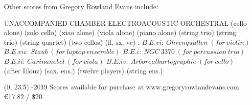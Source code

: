 \documentclass[10pt]{article}
\begin{document}

\begin{center}
\fontsize{.7cm}{1em}\selectfont Other scores from Gregory Rowland Evans include: \hfill
\end{center}
\vspace*{4\baselineskip}
{
\begin{center}
\setlength{\columnseprule}{1pt}
\setlength{\columnsep}{6em}

\begin{paracol}{4}
\fontsize{.4cm}{1em}\selectfont UNACCOMPANIED
\switchcolumn[1]
\fontsize{.4cm}{1em}\selectfont CHAMBER
\switchcolumn[2]
\fontsize{.4cm}{1em}\selectfont ELECTROACOUSTIC
\switchcolumn[3]
\fontsize{.4cm}{1em}\selectfont ORCHESTRAL
\switchcolumn[0]
\fontsize{.1cm}{0.5em}  (cello alone)
\switchcolumn[0]
\hfill
\switchcolumn[0]
\fontsize{.1cm}{0.5em}  (solo cello)
\switchcolumn[0]
\hfill
 \switchcolumn[0]
\fontsize{.1cm}{0.5em}  (xiao alone)
\switchcolumn[0]
\hfill
\switchcolumn[0]
\fontsize{.1cm}{0.5em}  (viola alone)
\switchcolumn[0]
\hfill
\switchcolumn[0]
\fontsize{.1cm}{0.5em}  (piano alone)
\switchcolumn[1]
\fontsize{.1cm}{0.5em} 
\switchcolumn[1]
\hfill
\switchcolumn[1]
\fontsize{.1cm}{0.5em}  (string trio)
\switchcolumn[1]
\hfill
\switchcolumn[1]
\fontsize{.1cm}{0.5em}  (string trio)
\switchcolumn[1]
\hfill
\switchcolumn[1]
\fontsize{.1cm}{0.5em}  (string quartet)
\switchcolumn[1]
\hfill
\switchcolumn[1]
\fontsize{.1cm}{0.5em}  (two cellos)
\switchcolumn[1]
\hfill
\switchcolumn[1]
\fontsize{.1cm}{0.5em}  (fl, sx, vc)
\switchcolumn[2]
\fontsize{.1cm}{0.5em} :
\switchcolumn[2]
\fontsize{.05cm}{0.5em}  $B.E.vi: \ Ohrenquallen \ (for \ violin)$
\switchcolumn[2]
\fontsize{.05cm}{0.5em}  $B.E.vii: \ Staub \ (for \ laptop \ ensemble)$
\switchcolumn[2]
\fontsize{.05cm}{0.5em}  $B.E.i: \ NGC \ 3370 \ (for \ percussion \ trio)$
\switchcolumn[2]
\fontsize{.05cm}{0.5em}  $B.E.ii: \ Carinanebel \ (for \ viola)$
\switchcolumn[2]
 \fontsize{.05cm}{0.5em} $B.E.iv: \ Arborealkartographie \ (for \ cello)$
\switchcolumn[3]
\fontsize{.1cm}{0.5em}  (after Illouz)
\switchcolumn[3]
\hfill
\switchcolumn[3]
\fontsize{.1cm}{0.5em}  (sax. ens.)
\switchcolumn[3]
\hfill
\switchcolumn[3]
\fontsize{.1cm}{0.5em}  (twelve players)
\switchcolumn[3]
\hfill
\switchcolumn[3]
\fontsize{.1cm}{0.5em}  (string ens.)


\end{paracol}
\end{center}
}

\begin{textblock}{23}(0, 23.5)
-2019 \hfill
Scores available for purchase at www.gregoryrowlandevans.com \hfill
\euro 17.82 / \$20
\end{textblock}
\end{document}
